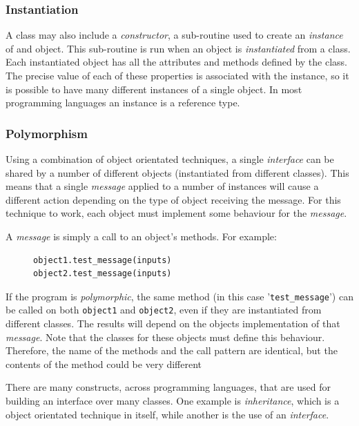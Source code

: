 \documentclass[9pt]{article}
\begin{document}
\subsubsection{Instantiation}
\label{sec:org03d8e7f}

A class may also include a \emph{constructor}, a sub-routine used to create an \emph{instance} of and object. This sub-routine is run when an object is \emph{instantiated} from a class. Each instantiated object has all the attributes and methods defined by the class. The precise value of each of these properties is associated with the instance, so it is possible to have many different instances of a single object. In most programming languages an instance is a reference type.

\subsubsection{Polymorphism}
\label{sec:org42db4d9}

Using a combination of object orientated techniques, a single \emph{interface} can be shared by a number of different objects (instantiated from different classes). This means that a single \emph{message} applied to a number of instances will cause a different action depending on the type of object receiving the message. For this technique to work, each object must implement some behaviour for the \emph{message}.

A \emph{message} is simply a call to an object's methods. For example:

\begin{figure}[H]
\begin{verbatim}
object1.test_message(inputs)
object2.test_message(inputs)
\end{verbatim}
\end{figure}

If the program is \emph{polymorphic}, the same method (in this case '\texttt{test\_message}') can be called on both \texttt{object1} and \texttt{object2}, even if they are instantiated from different classes. The results will depend on the objects implementation of that \emph{message}. Note that the classes for these objects must define this behaviour. Therefore, the name of the methods and the call pattern are identical, but the contents of the method could be very different

There are many constructs, across programming languages, that are used for building an interface over many classes. One example is \emph{inheritance}, which is a object orientated technique in itself, while another is the use of an \emph{interface}.
\end{document}
